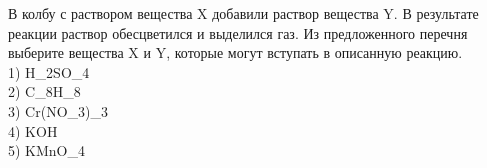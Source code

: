 В колбу с раствором вещества X добавили раствор вещества Y. В результате реакции раствор обесцветился и выделился газ.
Из предложенного перечня выберите вещества X и Y, которые могут вступать в описанную реакцию. \\

1) H_2SO_4\\
2) C_8H_8\\
3) Cr(NO_3)_3\\
4) KOH\\
5) KMnO_4\\

